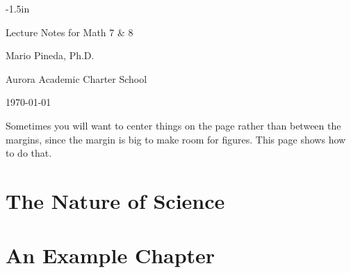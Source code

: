 \documentclass{textbook}
\begin{document}
\frontmatter

\thispagestyle{empty}
\begin{adjustwidth}{}{-1.5in}

 \centering
 \vspace{1in}
 \Huge Lecture Notes for Math 7 \& 8
 \normalsize
 \vspace{1in}

 Mario Pineda, Ph.D.
 
 Aurora Academic Charter School

 \vspace{1in}

\today

\vspace{1in}

Sometimes you will want to center things on the page rather than between the margins, since the margin is big to make room for figures. This page shows how to do that.

\end{adjustwidth}

\cleardoublepage

\tableofcontents

\mainmatter

\chapter{The Nature of Science}

\chapter{An Example Chapter}
\end{document}
